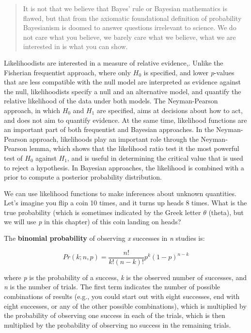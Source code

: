 \documentclass[
  oneside]{book}
\begin{document}
\begin{quote}
It is not that we believe that Bayes' rule or Bayesian mathematics is flawed, but that from the axiomatic foundational definition of probability Bayesianism is doomed to answer questions irrelevant to science. We do not care what you believe, we barely care what we believe, what we are interested in is what you can show.
\end{quote}

Likelihoodists are interested in a measure of relative evidence,. Unlike the Fisherian frequentist approach, where only \(H_0\) is specified, and lower \emph{p}-values that are less compatible with the null model are interpreted as evidence against the null, likelihoodists specify a null and an alternative model, and quantify the relative likelihood of the data under both models. The Neyman-Pearson approach, in which \(H_0\) and \(H_1\) are specified, aims at decisions about how to act, and does not aim to quantify evidence. At the same time, likelihood functions are an important part of both frequentist and Bayesian approaches. In the Neyman-Pearson approach, likelihoods play an important role through the Neyman-Pearson lemma, which shows that the likelihood ratio test it the most powerful test of \(H_0\) against \(H_1\), and is useful in determining the critical value that is used to reject a hypothesis. In Bayesian approaches, the likelihood is combined with a prior to compute a posterior probability distribution.

We can use likelihood functions to make inferences about unknown quantities. Let's imagine you flip a coin 10 times, and it turns up heads 8 times. What is the true probability (which is sometimes indicated by the Greek letter \(\theta\) (theta), but we will use \emph{p} in this chapter) of this coin landing on heads?

The \textbf{binomial probability} of observing \emph{x} successes in \emph{n} studies is:

\[
Pr\left( k;n, p \right) = \frac{n!}{k!\left( n - k \right)!}p^{k}{(1 - p)}^{n - k}
\]

where \emph{p} is the probability of a success, \emph{k} is the observed number of successes, and \emph{n} is the number of trials. The first term indicates the number of possible combinations of results (e.g., you could start out with eight successes, end with eight successes, or any of the other possible combinations), which is multiplied by the probability of observing one success in each of the trials, which is then multiplied by the probability of observing no success in the remaining trials.
\end{document}

